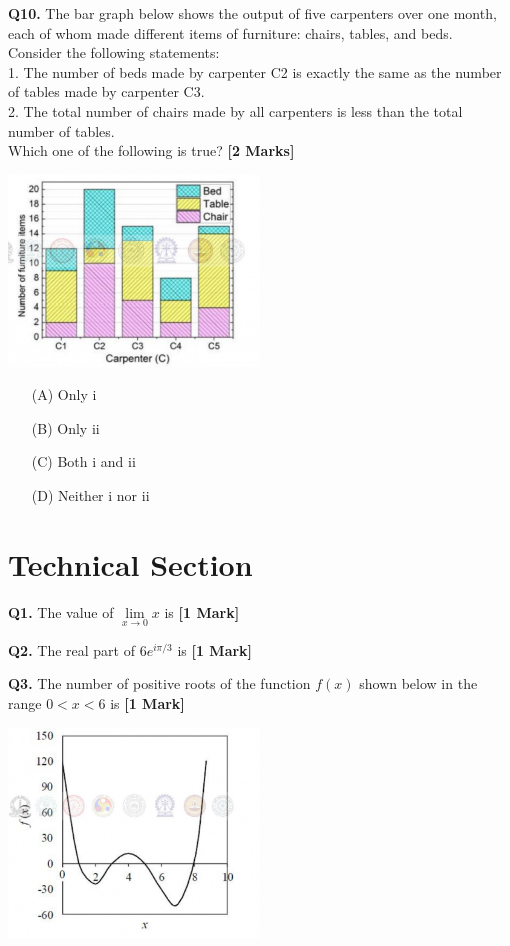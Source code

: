 \documentclass[11pt]{article}
\newcommand{\questiona}[2]{
    \noindent\textbf{Q#2.} #1 \hfill \textbf{[1 Mark]}
}
\newcommand{\questionb}[2]{
    \noindent\textbf{Q#2.} #1 \hfill \textbf{[2 Marks]}
}
\begin{document}
\questionb{The bar graph below shows the output of five carpenters over one month, each of whom made different items of furniture: chairs, tables, and beds. \\ Consider the following statements: \\ 1. The number of beds made by carpenter C2 is exactly the same as the number of tables made by carpenter C3. \\ 2. The total number of chairs made by all carpenters is less than the total number of tables. \\ Which one of the following is true?}{10}

\begin{center}
\includegraphics[width=0.5\textwidth]{figures/10.png}
\end{center}

\begin{enumerate}
    \item[(A)] Only i  
    \item[(B)] Only ii  
    \item[(C)] Both i and ii  
    \item[(D)] Neither i nor ii  
\end{enumerate}
\vspace{0.5cm}

\section*{Technical Section}

\questiona{The value of \( \lim\limits_{x \to 0} x \) is}{1}
\vspace{0.5cm}

\questiona{The real part of \( 6e^{i\pi/3} \) is}{2}

\vspace{0.5cm}

\questiona{The number of positive roots of the function \( f(x) \) shown below in the range \( 0 < x < 6 \) is}{3}
\begin{center}
\includegraphics[width=0.5\textwidth]{figures/3.png}
\end{center}
\end{document}
